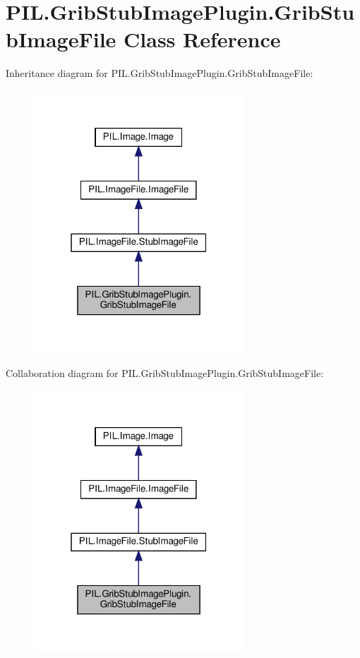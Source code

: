 \hypertarget{classPIL_1_1GribStubImagePlugin_1_1GribStubImageFile}{}\section{P\+I\+L.\+Grib\+Stub\+Image\+Plugin.\+Grib\+Stub\+Image\+File Class Reference}
\label{classPIL_1_1GribStubImagePlugin_1_1GribStubImageFile}


Inheritance diagram for P\+I\+L.\+Grib\+Stub\+Image\+Plugin.\+Grib\+Stub\+Image\+File\+:
\nopagebreak
\begin{figure}[H]
\begin{center}
\leavevmode
\includegraphics[width=223pt]{classPIL_1_1GribStubImagePlugin_1_1GribStubImageFile__inherit__graph}
\end{center}
\end{figure}


Collaboration diagram for P\+I\+L.\+Grib\+Stub\+Image\+Plugin.\+Grib\+Stub\+Image\+File\+:
\nopagebreak
\begin{figure}[H]
\begin{center}
\leavevmode
\includegraphics[width=223pt]{classPIL_1_1GribStubImagePlugin_1_1GribStubImageFile__coll__graph}
\end{center}
\end{figure}
